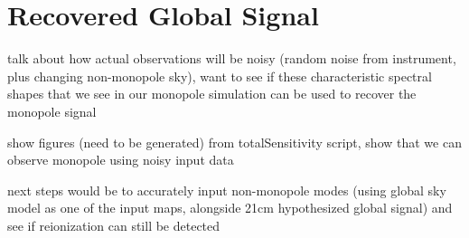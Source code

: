 \section{Recovered Global Signal}

talk about how actual observations will be noisy (random noise from instrument, 
plus changing non-monopole sky), want to see if these characteristic spectral 
shapes that we see in our monopole simulation can be used to recover the 
monopole signal

show figures (need to be generated) from totalSensitivity script, show that we 
can observe monopole using noisy input data

next steps would be to accurately input non-monopole modes (using global sky 
model as one of the input maps, alongside 21cm hypothesized global signal) and 
see if reionization can still be detected
